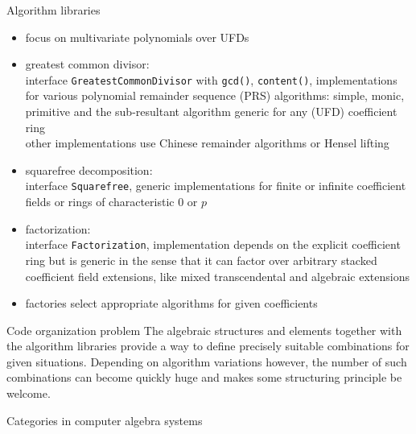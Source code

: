 \documentclass[final]{beamer}
\newcommand{\code}[1]{\texttt{#1}}
\begin{document}
\begin{frame}[fragile]
\begin{columns}[t]
\begin{column}{.3\linewidth}
  \begin{block}{\large Algorithm libraries}
  \scriptsize 
  \begin{itemize}
  \item focus on multivariate polynomials over UFDs
  \item greatest common divisor: \\
        interface \code{Greatest\-Common\-Divisor} with \code{gcd()}, \code{content()}, 
        implementations for various polynomial remainder sequence (PRS) algorithms: 
        simple, monic, primitive and the sub-resultant algorithm 
        generic for any (UFD) coefficient ring \\
        other implementations use Chinese remainder algorithms or Hensel lifting
  \item squarefree decomposition: \\
        interface \code{Square\-free}, 
        generic implementations for finite or infinite coefficient fields 
        or rings of characteristic $0$ or $p$
  \item factorization: \\
        interface \code{Factorization}, 
        implementation depends on the explicit coefficient ring 
        but is generic in the sense that it can factor
        over arbitrary stacked coefficient field extensions, like mixed
        transcendental and algebraic extensions
  \item factories select appropriate algorithms for given coefficients
  \end{itemize}
  \end{block}
  \hfill
  \begin{block}{\large Code organization problem}
  \scriptsize
The algebraic structures and elements together with the algorithm
libraries provide a way to define precisely suitable combinations
for given situations. Depending on algorithm variations however,
the number of such combinations can become quickly huge and makes
some structuring principle be welcome.
  \end{block}
  \hfill
  \begin{block}{\large Categories in computer algebra systems}
  \scriptsize
  \begin{enumerate}

\end{enumerate}
\end{block}
\end{column}
\end{columns}
\end{frame}
\end{document}
